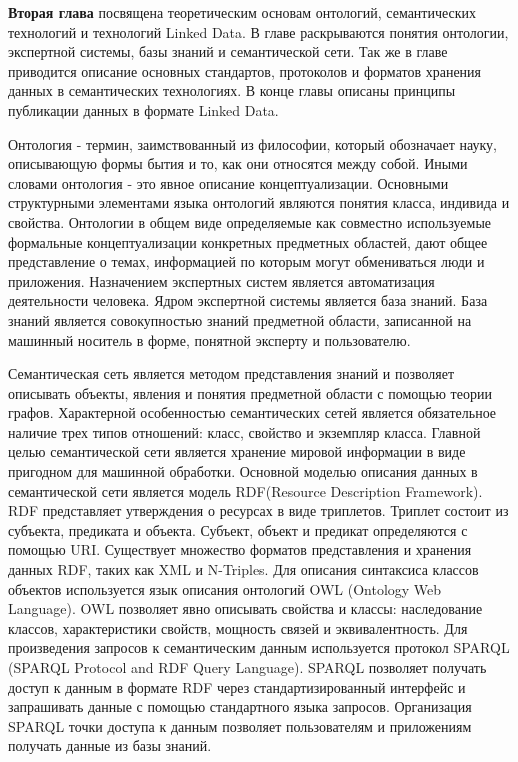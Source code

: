 \textbf{Вторая глава} посвящена теоретическим основам онтологий, семантических технологий и технологий Linked Data. В главе раскрываются понятия онтологии, экспертной системы, базы знаний и семантической сети. Так же в главе приводится описание основных стандартов, протоколов и форматов хранения данных в семантических технологиях. В конце главы описаны принципы публикации данных в формате Linked Data.


Онтология - термин, заимствованный из философии, который обозначает науку, описывающую формы бытия и то, как они относятся между собой. Иными словами онтология - это явное описание концептуализации. Основными структурными элементами языка онтологий являются понятия класса, индивида и свойства. Онтологии в общем виде определяемые как совместно используемые формальные концептуализации конкретных предметных областей, дают общее представление о темах, информацией по которым могут обмениваться люди и приложения. Назначением экспертных систем является автоматизация деятельности человека. Ядром экспертной системы является база знаний. База знаний является совокупностью  знаний предметной области, записанной на машинный носитель в форме, понятной эксперту и пользователю.

Семантическая сеть является  методом представления знаний и позволяет описывать объекты, явления и понятия предметной области с помощью теории графов. Характерной особенностью семантических сетей является обязательное наличие трех типов отношений: класс, свойство и экземпляр класса. Главной целью семантической сети является хранение мировой информации в виде пригодном для машинной обработки. Основной моделью описания данных в семантической сети является модель RDF(Resource Description Framework).  RDF представляет утверждения о ресурсах в виде триплетов. Триплет состоит из субъекта, предиката и объекта. Субъект, объект и предикат определяются с помощью URI. Существует множество форматов представления и хранения данных RDF, таких как XML и N-Triples. Для описания синтаксиса классов объектов используется язык описания онтологий OWL (Ontology Web Language). OWL позволяет явно описывать свойства и классы: наследование классов, характеристики свойств, мощность связей и эквивалентность. Для произведения запросов к семантическим данным используется протокол SPARQL (SPARQL Protocol and RDF Query Language). SPARQL позволяет получать доступ к данным в формате RDF через стандартизированный интерфейс и запрашивать данные с помощью стандартного языка запросов. Организация SPARQL точки доступа к данным позволяет пользователям и приложениям получать данные из базы знаний.

